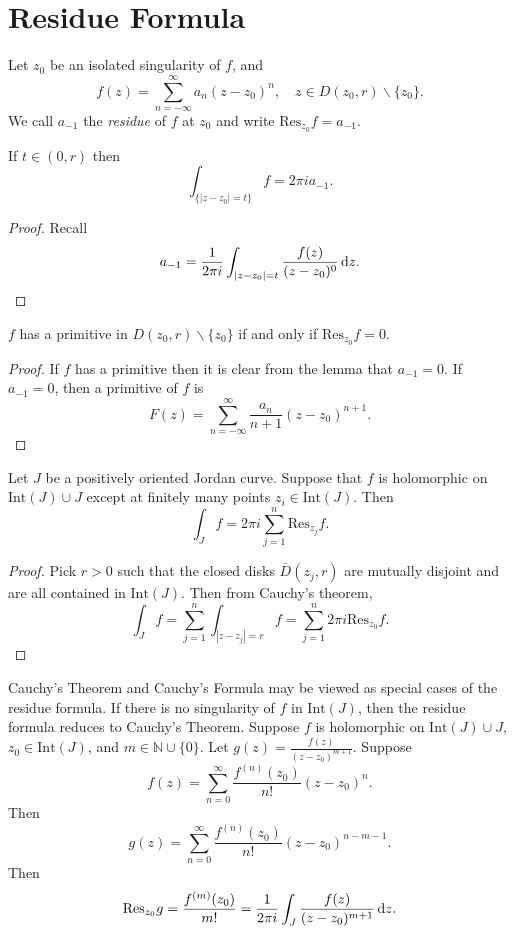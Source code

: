 \section{Residue Formula}
\begin{defn}[Residue]
Let $z_0$ be an isolated singularity of $f$, and
$$
f(z) = \sum_{n=-\infty}^\infty a_n (z - z_0)^n, \quad
z \in D(z_0, r) \backslash \{ z_0 \}.
$$
We call $a_{-1}$ the \emph{residue} of $f$ at $z_0$ and write
$\mathrm{Res}_{z_0} f = a_{-1}$.
\end{defn}

\begin{lemma}
If $t \in (0, r)$ then
$$
  \int_{\{|z - z_0| = t \}} f
= 2 \pi i a_{-1}.
$$
\end{lemma}
\begin{proof}
Recall
$$
  a_{-1}
= \frac{1}{2 \pi i}
  \int_{|z - z_0| = t}
    \frac{f(z)}{(z - z_0)^0}
    \mathop{}\!\mathrm{d} z.
$$
\end{proof}

\begin{theorem}
$f$ has a primitive in $D(z_0, r) \backslash \{ z_0 \}$
if and only if $\mathrm{Res}_{z_0} f = 0$.
\end{theorem}
\begin{proof}
If $f$ has a primitive then it is clear from the lemma that
$a_{-1} = 0$. If $a_{-1} = 0$, then a primitive of $f$ is
$$
F(z) = \sum_{n=-\infty}^\infty \frac{a_n}{n + 1} (z - z_0)^{n+1}.
$$
\end{proof}

\begin{theorem}
Let $J$ be a positively oriented Jordan curve. Suppose that
$f$ is holomorphic on $\mathrm{Int}(J) \cup J$ except at finitely
many points $z_i \in \mathrm{Int}(J)$. Then
$$
\int_J f = 2 \pi i \sum_{j=1}^n \mathrm{Res}_{z_j} f.
$$
\end{theorem}
\begin{proof}
Pick $r > 0$ such that the closed disks $\bar{D}(z_j, r)$ are
mutually disjoint and are all contained in $\mathrm{Int}(J)$.
Then from Cauchy's theorem,
$$
  \int_J f
= \sum_{j=1}^n \int_{|z - z_j| = r} f
= \sum_{j=1}^n 2 \pi i \mathrm{Res}_{z_0} f.
$$
\end{proof}

\begin{remark}
Cauchy's Theorem and Cauchy's Formula may be viewed as special cases
of the residue formula. If there is no singularity of $f$ in
$\mathrm{Int}(J)$,
then the residue formula reduces to Cauchy's Theorem. Suppose $f$ is
holomorphic on $\mathrm{Int}(J) \cup J$, $z_0 \in \mathrm{Int}(J)$,
and $m \in \mathbb{N} \cup \{0\}$. Let $g(z) = \frac{f(z)}{(z -
  z_0)^{m+1}}$.
Suppose
$$
f(z) = \sum_{n=0}^\infty \frac{f^{(n)}(z_0)}{n!}(z - z_0)^n.
$$
Then
$$
g(z) = \sum_{n=0}^\infty \frac{f^{(n)}(z_0)}{n!} (z - z_0)^{n - m - 1}.
$$
Then
$$
  \mathrm{Res}_{z_0} g
= \frac{f^{(m)}(z_0)}{m!}
= \frac{1}{2 \pi i}
  \int_J
    \frac{f(z)}
         {(z - z_0)^{m+1}}
    \mathop{}\!\mathrm{d} z.
$$
\end{remark}

